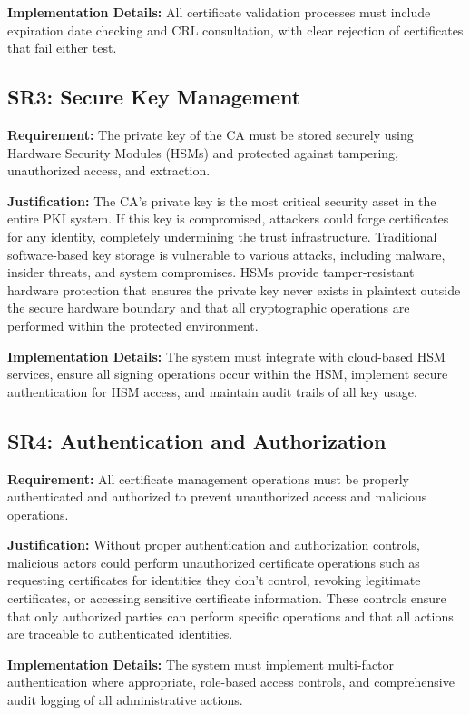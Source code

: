 \textbf{Implementation Details:} All certificate validation processes must include expiration date checking and CRL consultation, with clear rejection of certificates that fail either test.

\subsection{SR3: Secure Key Management}

\textbf{Requirement:} The private key of the CA must be stored securely using Hardware Security Modules (HSMs) and protected against tampering, unauthorized access, and extraction.

\textbf{Justification:} The CA's private key is the most critical security asset in the entire PKI system. If this key is compromised, attackers could forge certificates for any identity, completely undermining the trust infrastructure. Traditional software-based key storage is vulnerable to various attacks, including malware, insider threats, and system compromises. HSMs provide tamper-resistant hardware protection that ensures the private key never exists in plaintext outside the secure hardware boundary and that all cryptographic operations are performed within the protected environment.

\textbf{Implementation Details:} The system must integrate with cloud-based HSM services, ensure all signing operations occur within the HSM, implement secure authentication for HSM access, and maintain audit trails of all key usage.

\subsection{SR4: Authentication and Authorization}

\textbf{Requirement:} All certificate management operations must be properly authenticated and authorized to prevent unauthorized access and malicious operations.

\textbf{Justification:} Without proper authentication and authorization controls, malicious actors could perform unauthorized certificate operations such as requesting certificates for identities they don't control, revoking legitimate certificates, or accessing sensitive certificate information. These controls ensure that only authorized parties can perform specific operations and that all actions are traceable to authenticated identities.

\textbf{Implementation Details:} The system must implement multi-factor authentication where appropriate, role-based access controls, and comprehensive audit logging of all administrative actions.

